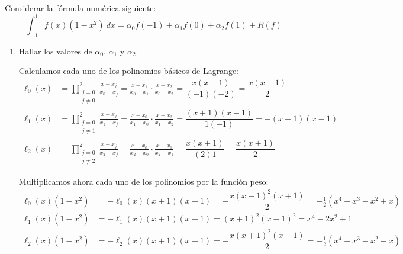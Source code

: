 \documentclass[12pt]{article}
\author{Arturo Olivares Martos}
\date{\today}
\begin{document}
    {\color{blue}

    \renewcommand{\headrulewidth}{1pt}
    \renewcommand{\headrule}{\hbox to\headwidth{%
    \color{blue}\leaders\hrule height \headrulewidth\hfill}}
    
    
    \begin{ejercicio}
        Considerar la fórmula numérica siguiente:
        \begin{equation*}
            \int_{-1}^1f(x)(1-x^2)\ dx=\alpha_0f(-1)+\alpha_1f(0)+\alpha_2f(1)+R(f)
        \end{equation*}
        \begin{enumerate}
            \item Hallar los valores de $\alpha_0$, $\alpha_1$ y $\alpha_2$.
            
            Calculamos cada uno de los polinomios básicos de Lagrange:
            \begin{align*}
                \ell_0(x)
                &=\prod_{\substack{j=0\\j\neq 0}}^2\frac{x-x_j}{x_0-x_j}
                = \frac{x-x_1}{x_0-x_1}\cdot\frac{x-x_2}{x_0-x_2}
                = \dfrac{x(x-1)}{(-1)(-2)} = \dfrac{x(x-1)}{2}\\
                \ell_1(x)
                &= \prod_{\substack{j=0\\j\neq 1}}^2\frac{x-x_j}{x_1-x_j}
                = \frac{x-x_0}{x_1-x_0}\cdot\frac{x-x_2}{x_1-x_2}
                = \dfrac{(x+1)(x-1)}{1(-1)} = -(x+1)(x-1)\\
                \ell_2(x)
                &= \prod_{\substack{j=0\\j\neq 2}}^2\frac{x-x_j}{x_2-x_j}
                = \frac{x-x_0}{x_2-x_0}\cdot\frac{x-x_1}{x_2-x_1}
                = \dfrac{x(x+1)}{(2)1} = \dfrac{x(x+1)}{2}
            \end{align*}

            Multiplicamos ahora cada uno de los polinomios por la función peso:
            \begin{align*}
                \ell_0(x)(1-x^2) &= -\ell_0(x)(x+1)(x-1) = -\dfrac{x(x-1)^2(x+1)}{2} = -\frac{1}{2}(x^4-x^3-x^2+x)\\
                \ell_1(x)(1-x^2) &= -\ell_1(x)(x+1)(x-1) = (x+1)^2(x-1)^2 = x^4-2x^2+1\\
                \ell_2(x)(1-x^2) &= -\ell_2(x)(x+1)(x-1) = -\dfrac{x(x+1)^2(x-1)}{2} = -\frac{1}{2}(x^4+x^3-x^2-x)
            \end{align*}


\end{enumerate}
\end{ejercicio}}
\end{document}
